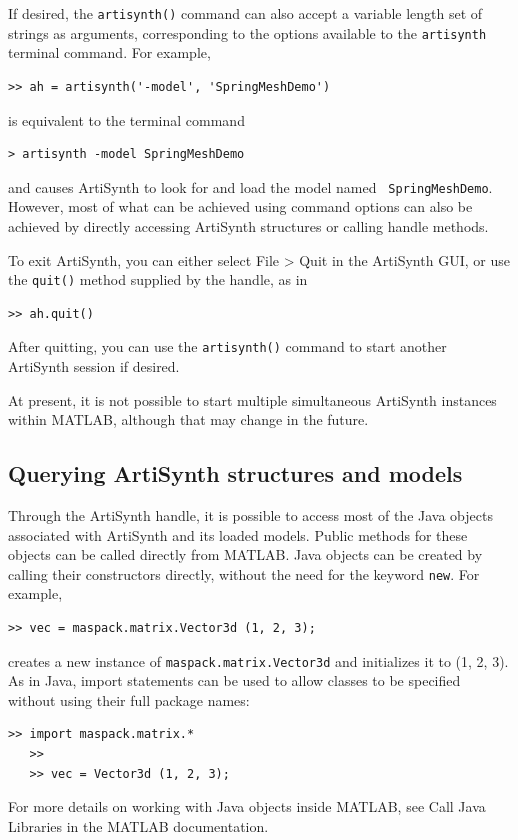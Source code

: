 \documentclass{article}
\begin{document}
If desired, the {\tt artisynth()} command can also accept a variable
length set of strings as arguments, corresponding to the
options available to the {\tt artisynth} terminal command.  For
example,
%
\begin{lstlisting}[]
  >> ah = artisynth('-model', 'SpringMeshDemo')
\end{lstlisting}
%
is equivalent to the terminal command
%
\begin{lstlisting}[]
  > artisynth -model SpringMeshDemo
\end{lstlisting}
%
and causes ArtiSynth to look for and load the model named {\tt
SpringMeshDemo}. However, most of what can be achieved using command
options can also be achieved by directly accessing ArtiSynth
structures or calling handle methods.

To exit ArtiSynth, you can either select {\sf File > Quit} in the
ArtiSynth GUI, or use the {\tt quit()} method supplied by the handle,
as in
%
\begin{lstlisting}[]
  >> ah.quit()
\end{lstlisting}
%

After quitting, you can use the {\tt artisynth()} command to start
another ArtiSynth session if desired.

\begin{sideblock}
At present, it is not possible to start multiple simultaneous
ArtiSynth instances within MATLAB, although that may change in the
future.
\end{sideblock}

\subsection{Querying ArtiSynth structures and models}
\label{MatlabQuerying:sec}

Through the ArtiSynth handle, it is possible to access most of the
Java objects associated with ArtiSynth and its loaded models.  Public
methods for these objects can be called directly from MATLAB. 
Java objects can be created by calling their constructors
directly, without the need for the keyword {\tt new}.
For example, 
%
\begin{lstlisting}[]
   >> vec = maspack.matrix.Vector3d (1, 2, 3);
\end{lstlisting}
%
creates a new instance of {\tt maspack.matrix.Vector3d} and
initializes it to (1, 2, 3). As in Java, import statements can be used
to allow classes to be specified without using their full package
names:
%
\begin{lstlisting}[]
   >> import maspack.matrix.*
   >>
   >> vec = Vector3d (1, 2, 3);
\end{lstlisting}
%
For more details on working with Java objects inside MATLAB, see {\sf
Call Java Libraries} in the MATLAB documentation.
\end{document}
